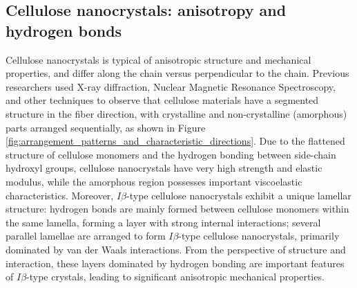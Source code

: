 \documentclass{article}
\begin{document}
\subsection{Cellulose nanocrystals: anisotropy and hydrogen bonds}\indent

Cellulose nanocrystals is typical of anisotropic structure and mechanical properties, and differ along the chain versus perpendicular to the chain\cite{kim2015review,moon2011cellulose}.
Previous researchers used X-ray diffraction\cite{nishiyama2002crystal}, Nuclear Magnetic Resonance Spectroscopy\cite{atalla1984native}, and other techniques to observe that cellulose materials have a segmented structure in the fiber direction, with crystalline and non-crystalline (amorphous) parts arranged sequentially\cite{nishiyama2009structure,mazeau2003molecular}, as shown in Figure \ref{fig:arrangement_patterns_and_characteristic_directions}.
Due to the flattened structure of cellulose monomers and the hydrogen bonding between side-chain hydroxyl groups, cellulose nanocrystals have very high strength and elastic modulus\cite{moon2011cellulose}, while the amorphous region possesses important viscoelastic characteristics\cite{mazeau2003molecular}.
Moreover, $I\beta$-type cellulose nanocrystals exhibit a unique lamellar structure\cite{wohlert2022cellulose}: hydrogen bonds are mainly formed between cellulose monomers within the same lamella, forming a layer with strong internal interactions; several parallel lamellae are arranged to form $I\beta$-type cellulose nanocrystals, primarily dominated by van der Waals interactions.
From the perspective of structure and interaction, these layers dominated by hydrogen bonding are important features of $I\beta$-type crystals, leading to significant anisotropic mechanical properties.
\end{document}

